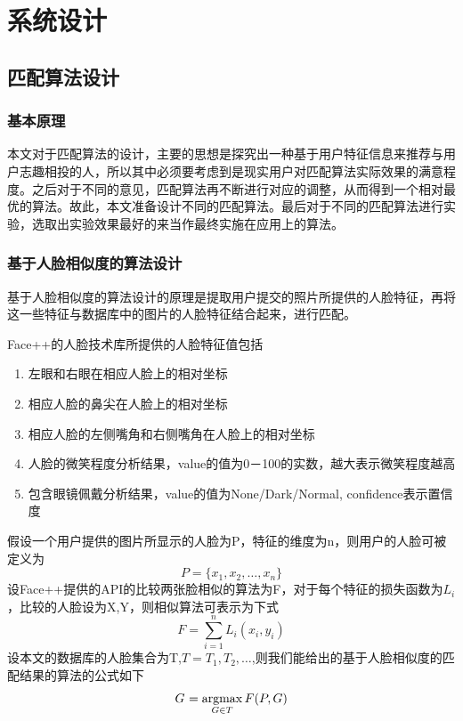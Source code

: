 
\chapter{系统设计}

\section{匹配算法设计}

\subsection{基本原理}
本文对于匹配算法的设计，主要的思想是探究出一种基于用户特征信息来推荐与用户志趣相投的人，所以其中必须要考虑到是现实用户对匹配算法实际效果的满意程度。之后对于不同的意见，匹配算法再不断进行对应的调整，从而得到一个相对最优的算法。故此，本文准备设计不同的匹配算法。最后对于不同的匹配算法进行实验，选取出实验效果最好的来当作最终实施在应用上的算法。
\subsection{基于人脸相似度的算法设计}

基于人脸相似度的算法设计的原理是提取用户提交的照片所提供的人脸特征，再将这一些特征与数据库中的图片的人脸特征结合起来，进行匹配。

Face++的人脸技术库所提供的人脸特征值包括
\begin{enumerate}
\item 左眼和右眼在相应人脸上的相对坐标
\item 相应人脸的鼻尖在人脸上的相对坐标
\item 相应人脸的左侧嘴角和右侧嘴角在人脸上的相对坐标
\item 人脸的微笑程度分析结果，value的值为0－100的实数，越大表示微笑程度越高
\item 包含眼镜佩戴分析结果，value的值为None/Dark/Normal, confidence表示置信度
\end{enumerate}
假设一个用户提供的图片所显示的人脸为P，特征的维度为n，则用户的人脸可被定义为
\begin{equation*}
P=\{x_1,x_2,\ldots,x_n\}
\end{equation*}
设Face++提供的API的比较两张脸相似的算法为F，对于每个特征的损失函数为$L_i$，比较的人脸设为X,Y，则相似算法可表示为下式
\begin{equation*}
F=\sum_{i=1}^n L_i(x_i, y_i)
\end{equation*}
设本文的数据库的人脸集合为T,$T={T_1,T_2,\ldots}$,则我们能给出的基于人脸相似度的匹配结果的算法的公式如下
\begin{equation*}
G^{\*} = \mathop{\argmax_{G \in T}}{F(P,G)}
\end{equation*}

